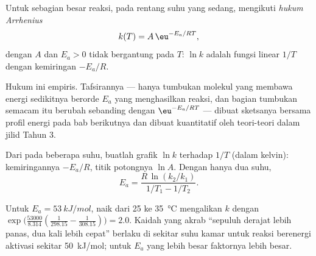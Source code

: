 \begin{theorem}\label{thm:b1:rate-laws:arrhenius}
Untuk sebagian besar reaksi, pada rentang suhu yang sedang, 
mengikuti \emph{hukum Arrhenius}
\[
  k(T) = A\,\eu^{-E_a/RT} ,
\]
dengan $A$ dan $E_a > 0$ tidak bergantung pada $T$: $\ln k$ adalah fungsi
linear $1/T$ dengan kemiringan $-E_a/R$.
\end{theorem}
\admitted

\begin{remark}[Makna $E_a$]\label{rem:b1:rate-laws:meaning}
Hukum ini empiris. Tafsirannya --- hanya tumbukan molekul yang membawa
energi sedikitnya berorde $E_a$ yang menghasilkan reaksi, dan bagian
tumbukan semacam itu berubah sebanding dengan $\eu^{-E_a/RT}$ --- dibuat
sketsanya bersama profil energi pada bab berikutnya dan dibuat
kuantitatif oleh teori-teori  dalam jilid Tahun 3.
\end{remark}

\begin{method}[Menentukan $E_a$]\label{met:b1:rate-laws:arrhenius-plot}
Dari  pada beberapa suhu, buatlah grafik $\ln k$ terhadap
$1/T$ (dalam kelvin): kemiringannya $-E_a/R$, titik potongnya $\ln A$.
Dengan hanya dua suhu,
\[
  E_a = \frac{R\,\ln(k_2/k_1)}{1/T_1 - 1/T_2} .
\]
\end{method}

\begin{example}\label{ex:b1:rate-laws:doubling}
Untuk $E_a = \qty{53}{kJ/mol}$, naik dari 25 ke \qty{35}{\celsius}
mengalikan $k$ dengan $\exp\!\big(\frac{53000}{8.314}(\frac{1}{298.15} -
\frac{1}{308.15})\big) = 2.0$. Kaidah yang akrab ``sepuluh derajat lebih
panas, dua kali lebih cepat'' berlaku di sekitar suhu kamar untuk reaksi
berenergi aktivasi sekitar \qty{50}{kJ/mol}; untuk $E_a$ yang lebih besar
faktornya lebih besar.
\end{example}

